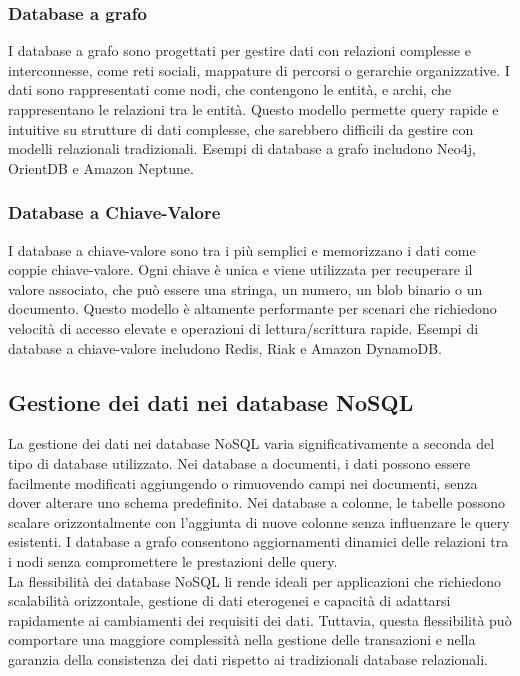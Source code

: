 \documentclass{article}
\begin{document}
\subsubsection{Database a grafo}
I database a grafo sono progettati per gestire dati con relazioni complesse e interconnesse, come reti sociali, mappature di percorsi o gerarchie organizzative. I dati sono rappresentati come nodi, che contengono le entità, e archi, che rappresentano le relazioni tra le entità. Questo modello permette query rapide e intuitive su strutture di dati complesse, che sarebbero difficili da gestire con modelli relazionali tradizionali. Esempi di database a grafo includono Neo4j, OrientDB e Amazon Neptune.

\subsubsection{Database a Chiave-Valore}
I database a chiave-valore sono tra i più semplici e memorizzano i dati come coppie chiave-valore. Ogni chiave è unica e viene utilizzata per recuperare il valore associato, che può essere una stringa, un numero, un blob binario o un documento. Questo modello è altamente performante per scenari che richiedono velocità di accesso elevate e operazioni di lettura/scrittura rapide. Esempi di database a chiave-valore includono Redis, Riak e Amazon DynamoDB.

\subsection{Gestione dei dati nei database NoSQL}
La gestione dei dati nei database NoSQL varia significativamente a seconda del tipo di database utilizzato. Nei database a documenti, i dati possono essere facilmente modificati aggiungendo o rimuovendo campi nei documenti, senza dover alterare uno schema predefinito. Nei database a colonne, le tabelle possono scalare orizzontalmente con l'aggiunta di nuove colonne senza influenzare le query esistenti. I database a grafo consentono aggiornamenti dinamici delle relazioni tra i nodi senza compromettere le prestazioni delle query.\\
La flessibilità dei database NoSQL li rende ideali per applicazioni che richiedono scalabilità orizzontale, gestione di dati eterogenei e capacità di adattarsi rapidamente ai cambiamenti dei requisiti dei dati. Tuttavia, questa flessibilità può comportare una maggiore complessità nella gestione delle transazioni e nella garanzia della consistenza dei dati rispetto ai tradizionali database relazionali.
\end{document}
